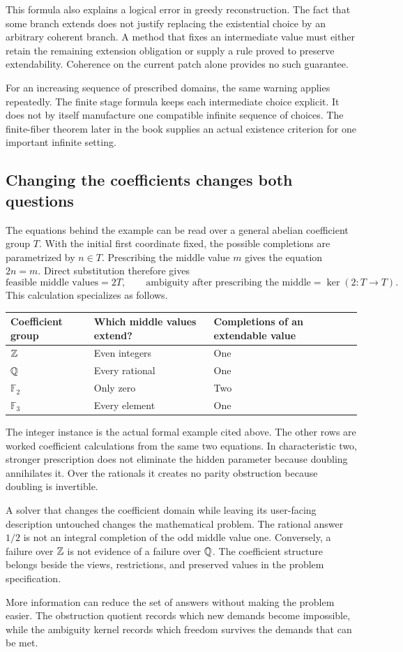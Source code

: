 This formula also explains a logical error in greedy reconstruction. The fact that some branch extends does not justify replacing the existential choice by an arbitrary coherent branch. A method that fixes an intermediate value must either retain the remaining extension obligation or supply a rule proved to preserve extendability. Coherence on the current patch alone provides no such guarantee.

For an increasing sequence of prescribed domains, the same warning applies repeatedly. The finite stage formula keeps each intermediate choice explicit. It does not by itself manufacture one compatible infinite sequence of choices. The finite-fiber theorem later in the book supplies an actual existence criterion for one important infinite setting.

\subsection{Changing the coefficients changes both questions}
The equations behind the example can be read over a general abelian coefficient group \(T\). With the initial first coordinate fixed, the possible completions are parametrized by \(n\in T\). Prescribing the middle value \(m\) gives the equation \(2n=m\). Direct substitution therefore gives
\[
 \text{feasible middle values}=2T,\qquad
 \text{ambiguity after prescribing the middle}=\ker(2:T\to T).
\]
This calculation specializes as follows.
\begin{center}
\begin{tabular}{@{}lll@{}}
\toprule
Coefficient group & Which middle values extend? & Completions of an extendable value\\
\midrule
\(\mathbb Z\) & Even integers & One\\
\(\mathbb Q\) & Every rational & One\\
\(\mathbb F_2\) & Only zero & Two\\
\(\mathbb F_3\) & Every element & One\\
\bottomrule
\end{tabular}
\end{center}
The integer instance is the actual formal example cited above. The other rows are worked coefficient calculations from the same two equations. In characteristic two, stronger prescription does not eliminate the hidden parameter because doubling annihilates it. Over the rationals it creates no parity obstruction because doubling is invertible.

A solver that changes the coefficient domain while leaving its user-facing description untouched changes the mathematical problem. The rational answer \(1/2\) is not an integral completion of the odd middle value one. Conversely, a failure over \(\mathbb Z\) is not evidence of a failure over \(\mathbb Q\). The coefficient structure belongs beside the views, restrictions, and preserved values in the problem specification.

\begin{insight}
More information can reduce the set of answers without making the problem easier. The obstruction quotient records which new demands become impossible, while the ambiguity kernel records which freedom survives the demands that can be met.
\end{insight}
